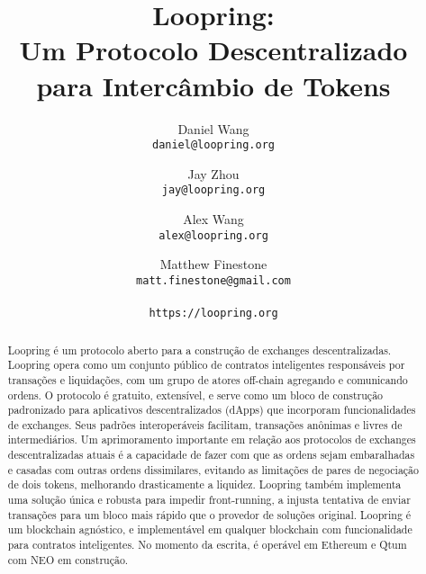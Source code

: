 \documentclass[UTF8,nofonts]{article}
\title{\textbf{Loopring:}\\\textbf{Um Protocolo Descentralizado para Intercâmbio de Tokens}}
\author{
  Daniel Wang\\
  \texttt{daniel@loopring.org}\\
  \and
  	Jay Zhou\\
  	\texttt{jay@loopring.org}\\
  	\and
  	Alex Wang\\
  	\texttt{alex@loopring.org}\\
  	\and
  	Matthew Finestone\\
  	\texttt{matt.finestone@gmail.com}\\ 
  \\
  \texttt{https://loopring.org}
 }
\begin{document}
\maketitle

\begin{abstract}
Loopring é um protocolo aberto para a construção de exchanges descentralizadas. Loopring opera como um conjunto público de contratos inteligentes responsáveis por transações e liquidações, com um grupo de atores off-chain agregando e comunicando ordens. O protocolo é gratuito, extensível, e serve como um bloco de construção padronizado para aplicativos descentralizados (dApps) que incorporam funcionalidades de exchanges. Seus padrões interoperáveis facilitam, transações anônimas e livres de intermediários. Um aprimoramento importante em relação aos protocolos de exchanges descentralizadas atuais é a capacidade de fazer com que as ordens sejam embaralhadas e casadas com outras ordens dissimilares, evitando as limitações de pares de negociação de dois tokens, melhorando drasticamente a liquidez. Loopring também implementa uma solução única e robusta para impedir front-running, a injusta tentativa de enviar transações para um bloco mais rápido que o provedor de soluções original. Loopring é um blockchain agnóstico, e implementável em qualquer blockchain com funcionalidade para contratos inteligentes. No momento da escrita, é operável em Ethereum\cite{buterin2017ethereum} \cite{wood2014ethereum} e Qtum \cite{dai2017smart} com NEO \cite{atterlonn2018distributed} em construção.
\end{abstract}
\end{document}

